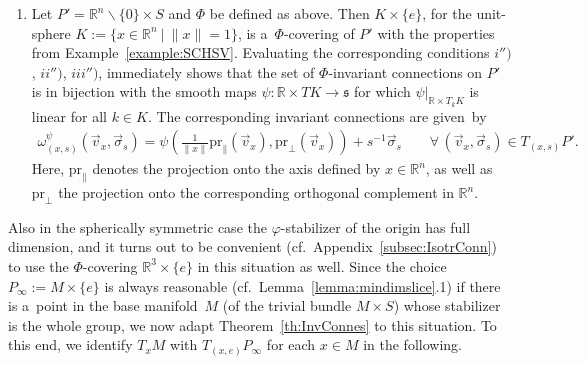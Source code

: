 \documentclass[pdftex]{sigma}
\numberwithin{equation}{section}
\begin{document}
\begin{Example}
\begin{enumerate}
Finally, it is straightforward to see that $(\Phi^{*}\omega_0)|_{\mathfrak{g}\times TP_\infty}=\psi=0$ holds.
\item
Let $P'=\mathbb{R}^n\backslash \{0\}\times S$ and $\Phi$ be def\/ined as above.
Then $K\times\{e\}$, for the unit-sphere $K:=\{x\in \mathbb{R}^n\:|\: \|x\|=1\}$, is a~$\Phi$-covering of $P'$ with the
properties from Example~\ref{example:SCHSV}.
Evaluating the corresponding conditions $i'')$, $ii'')$, $iii'')$, immediately shows that the set
of $\Phi$-invariant connections on $P'$ is in bijection with the smooth maps $\psi\colon \mathbb{R} \times
TK\rightarrow\mathfrak{s}$ for which $\psi|_{\mathbb{R} \times T_kK}$ is linear for all $k\in K$.
The corresponding invariant connections are given~by
\begin{gather*}
\omega^\psi_{(x,s)}(\vec{v}_x,\vec{\sigma}_s)
=\psi\left(\textstyle\frac{1}{\|x\|}\mathrm{pr}_{\|}(\vec{v}_x),\mathrm{pr}_{\perp}(\vec{v}_x)\right)
+s^{-1}\vec{\sigma}_s
\qquad\forall\, (\vec{v}_x,\vec{\sigma}_s)\in T_{(x,s)}P'.
\end{gather*}
Here, $\mathrm{pr}_{\|}$ denotes the projection onto the axis def\/ined by $x\in \mathbb{R}^n$, as well as $\mathrm{pr}_{\perp}$
the projection onto the corresponding orthogonal complement in $\mathbb{R}^n$.
\end{enumerate}
\end{Example}

 Also in the spherically symmetric case the $\varphi$-stabilizer of the origin has full dimension, and it turns
out to be convenient (cf.\ Appendix~\ref{subsec:IsotrConn}) to use the $\Phi$-covering $\mathbb{R}^3\times \{e\}$ in this situation as well.
Since the choice $P_\infty:=M\times\{e\}$ is always reasonable (cf.\ Lemma~\ref{lemma:mindimslice}.1) if there is a~point in the base manifold~$M$ (of the trivial bundle $M\times S$) whose
stabilizer is the whole group, we now adapt Theorem~\ref{th:InvConnes} to this situation.
To this end, we identify $T_xM$ with $T_{(x,e)}P_\infty$ for each $x\in M$ in the following.
\end{document}
